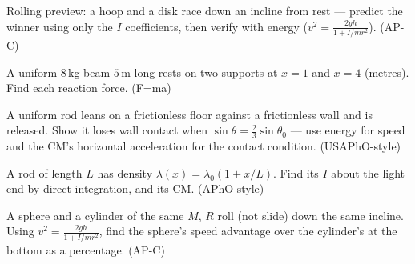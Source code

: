 \begin{exercise}[medium]
Rolling preview: a hoop and a disk race down an incline from rest ---
predict the winner using only the $I$ coefficients, then verify with
energy ($v^{2}=\frac{2gh}{1+I/mr^{2}}$). (AP-C)
\end{exercise}
\begin{exercise}[medium]
A uniform $8$\,kg beam $5$\,m long rests on two supports at $x=1$ and
$x=4$ (metres). Find each reaction force. (F=ma)
\end{exercise}
\begin{exercise}[hard]
A uniform rod leans on a frictionless floor against a frictionless wall
and is released. Show it loses wall contact when
$\sin\theta=\frac{2}{3}\sin\theta_0$ --- use energy for speed and the CM's
horizontal acceleration for the contact condition. (USAPhO-style)
\end{exercise}
\begin{exercise}[hard]
A rod of length $L$ has density $\lambda(x)=\lambda_0(1+x/L)$. Find its
$I$ about the light end by direct integration, and its CM. (APhO-style)
\end{exercise}
\begin{exercise}[medium]
A sphere and a cylinder of the same $M$, $R$ roll (not slide) down the
same incline. Using $v^{2}=\frac{2gh}{1+I/mr^{2}}$, find the sphere's
speed advantage over the cylinder's at the bottom as a percentage.
(AP-C)
\end{exercise}

